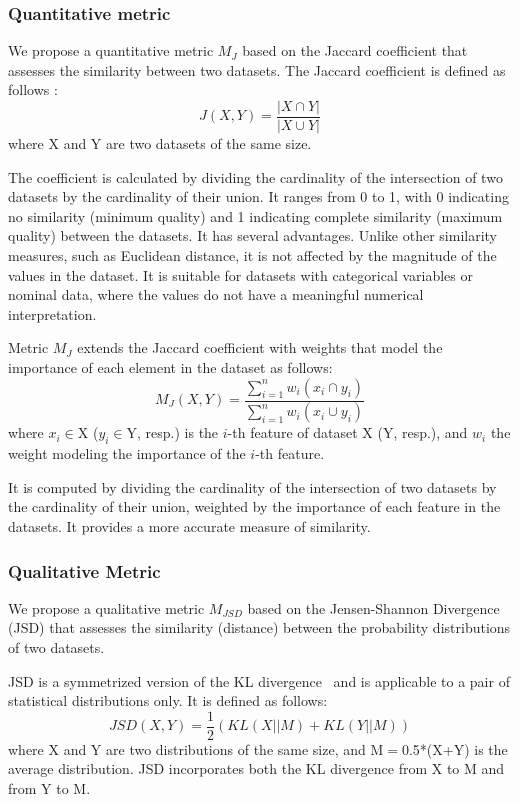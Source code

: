 \subsubsection{Quantitative metric}
We propose a quantitative metric $M_J$ based on the Jaccard coefficient that assesses the similarity between two datasets. The Jaccard coefficient is defined as follows \cite{RAHMAN20102707}: \[J(X,Y) = \frac{|X \cap Y|}{|X \cup Y|}\]
where X and Y are two datasets of the same size.

The coefficient is calculated by dividing the cardinality of the intersection of two datasets by the cardinality of their union. It ranges from 0 to 1, with 0 indicating no similarity (minimum quality) and 1 indicating complete similarity (maximum quality) between the datasets. It has several advantages. Unlike other similarity measures, such as Euclidean distance, it is not affected by the magnitude of the values in the dataset. It is suitable for datasets with categorical variables or nominal data, where the values do not have a meaningful numerical interpretation.

Metric $M_J$ extends the Jaccard coefficient with weights that model the importance of each element in the dataset as follows:\[M_J(X,Y) = \frac{\sum_{i=1}^{n}w_i(x_i \cap y_i)}{\sum_{i=1}^{n}w_i(x_i \cup y_i)}\]
where $x_i$$\in$X ($y_i$$\in$Y, resp.) is the $i$-th feature of dataset X (Y, resp.), and $w_i$ the weight modeling the importance of the $i$-th feature.

It is computed by dividing the cardinality of the intersection of two datasets by the cardinality of their union, weighted by the importance of each feature in the datasets. It provides a more accurate measure of similarity. 

\subsubsection{Qualitative Metric}
We propose a qualitative metric $M_{JSD}$ based on the Jensen-Shannon Divergence (JSD) that assesses the similarity (distance) between the probability distributions of two datasets.

JSD is a symmetrized version of the KL divergence~\cite{Fuglede} and is applicable to a pair of statistical distributions only. It is defined as follows:
\[JSD(X, Y) = \frac{1}{2} \left( KL(X || M)
  + KL(Y || M) \right)\]
%
where X and Y are two distributions of the same size, and M$=$0.5*(X+Y) is the average distribution.
JSD incorporates both the KL divergence from X to M and from Y to M.

